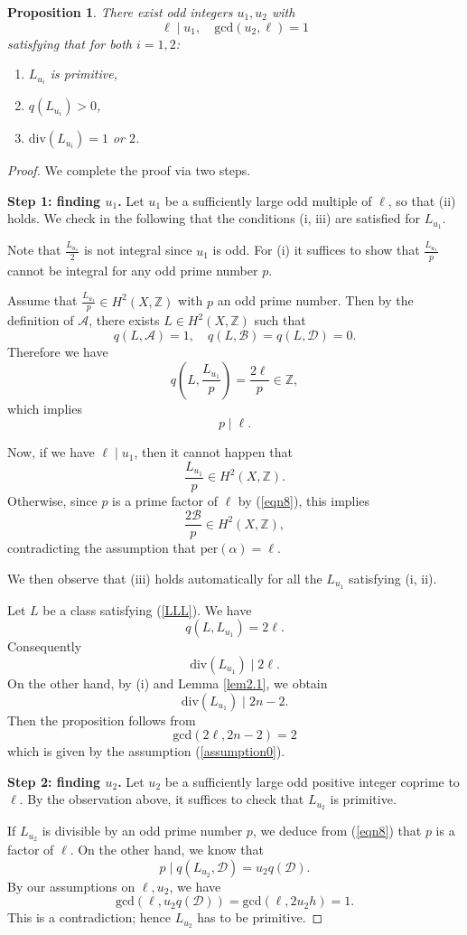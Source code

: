 \documentclass[11pt]{amsart}
\theoremstyle{plain}
\newtheorem{prop}[thm]{Proposition}
\theoremstyle{definition}
\theoremstyle{remark}
\newcommand{\BZ}{{\mathbb{Z}}}
\newcommand{\CA}{{\mathcal A}}
\newcommand{\CB}{{\mathcal B}}
\newcommand{\CD}{{\mathcal D}}
\begin{document}
\begin{prop}\label{prop2.3}
There exist odd integers $u_1,u_2$ with \[
\ell \mid u_1, \quad \mathrm{gcd}(u_2,\ell)=1
\]
satisfying that for both $i=1,2$:
\begin{enumerate}
    \item[(i)] $L_{u_i}$ is primitive,
    \item[(ii)] $q(L_{u_i}) >0$,
    \item[(iii)] $\mathrm{div}(L_{u_i}) =1$ or $2$.
\end{enumerate}
\end{prop}


\begin{proof}
We complete the proof via two steps.

\medskip
{\bf \noindent Step 1: finding $u_1$.}
Let $u_1$ be a sufficiently large odd multiple of $\ell$, so that (ii) holds. We check in the following that the conditions (i, iii) are satisfied for $L_{u_1}$.

Note that $\frac{L_{u_1}}{2}$ is not integral since $u_1$ is odd. For (i) it suffices to show that $\frac{L_{u_1}}{p}$ cannot be integral for any odd prime number $p$.

Assume that $\frac{L_{u_1}}{p} \in H^2(X, \BZ)$ with $p$ an odd prime number. Then by the definition of $\CA$, there exists $L \in H^2(X, \BZ)$ such that 
\begin{equation}\label{LLL}
q(L, \CA) =1, \quad q(L, \CB) =q(L, \CD)=0.
\end{equation}
Therefore we have
\[
q\left(L, \frac{L_{u_1}}{p}\right) = \frac{2\ell}{p} \in \BZ,
\]
which implies 
\begin{equation}\label{eqn8}
p \mid \ell.
\end{equation}    

Now, if we have $\ell \mid u_1$, then it cannot happen that
\[
\frac{L_{u_1}}{p} \in H^2(X, \BZ).
\]
Otherwise, since $p$ is a prime factor of $\ell$ by (\ref{eqn8}), this implies 
\[
\frac{2\CB}{p} \in H^2(X,\BZ),
\]
contradicting the assumption that $\mathrm{per}(\alpha) = \ell$. 


We then observe that (iii) holds automatically for all the $L_{u_1}$ satisfying (i, ii).

Let $L$ be a class satisfying (\ref{LLL}). We have
\[
q(L, L_{u_1}) = 2\ell.
\]
Consequently 
\[
\mathrm{div}(L_{u_1}) \mid 2\ell.
\]
On the other hand, by (i) and Lemma \ref{lem2.1}, we obtain
\[
\mathrm{div}(L_{u_1}) \mid 2n-2.
\]
Then the proposition follows from 
\[
\mathrm{gcd}(2\ell, 2n-2) = 2
\]
which is given by the assumption (\ref{assumption0}).

\medskip
{\bf \noindent Step 2: finding $u_2$.}
Let $u_2$ be a sufficiently large odd positive integer coprime to $\ell$. By the observation above, it suffices to check that $L_{u_2}$ is primitive. 


If $L_{u_2}$ is divisible by an odd prime number $p$, we deduce from (\ref{eqn8}) that $p$ is a factor of $\ell$. On the other hand, we know that 
\[
p \mid q(L_{u_2}, \CD) = u_2q(\CD).
\]
By our assumptions on $\ell, u_2$, we have 
\[
\mathrm{gcd}(\ell, u_2q(\CD)) =\mathrm{gcd}(\ell, 2u_2h) = 1.
\]
This is a contradiction; hence $L_{u_2}$ has to be primitive.
\end{proof}
\end{document}
